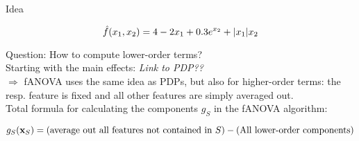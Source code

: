 \documentclass[11pt,compress,t,notes=noshow, aspectratio=169, xcolor=table]{beamer}
\begin{document}
\begin{frame}{Idea}

    \begin{equation}
        \hat{f}(x_1, x_2) = 4 - 2x_1 + 0.3 e^{x_2} + |x_1|x_2
    \end{equation}

    Question: How to compute lower-order terms? \\
    Starting with the main effects: %
    \textit{Link to PDP??} \\
    \(\Rightarrow\) fANOVA uses the same idea as PDPs, but also for higher-order terms: the resp. feature is fixed and all other features are simply averaged out. \\

    Total formula for calculating the components \(g_S\) in the fANOVA algorithm:

    \begin{equation*}
        g_{S} (\mathbf{x}_S) = (\text{average out all features not contained in } S) - (\text{All lower-order components})
    \end{equation*}
    
\end{frame}
\end{document}
